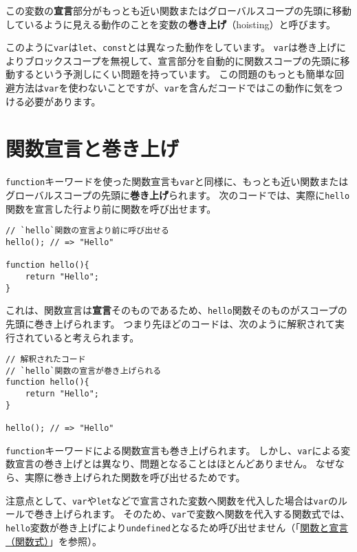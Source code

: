 この変数の\textbf{宣言}部分がもっとも近い関数またはグローバルスコープの先頭に移動しているように見える動作のことを変数の\textbf{巻き上げ}（hoisting）と呼びます。

このように\texttt{var}は\texttt{let}、\texttt{const}とは異なった動作をしています。
\texttt{var}は巻き上げによりブロックスコープを無視して、宣言部分を自動的に関数スコープの先頭に移動するという予測しにくい問題を持っています。
この問題のもっとも簡単な回避方法は\texttt{var}を使わないことですが、\texttt{var}を含んだコードではこの動作に気をつける必要があります。

\hypertarget{function-declaration-hoisting}{%
\section{関数宣言と巻き上げ}\label{function-declaration-hoisting}}

\texttt{function}キーワードを使った関数宣言も\texttt{var}と同様に、もっとも近い関数またはグローバルスコープの先頭に\textbf{巻き上げ}られます。
次のコードでは、実際に\texttt{hello}関数を宣言した行より前に関数を呼び出せます。

\begin{lstlisting}
// `hello`関数の宣言より前に呼び出せる
hello(); // => "Hello"

function hello(){
    return "Hello";
}
\end{lstlisting}

これは、関数宣言は\textbf{宣言}そのものであるため、\texttt{hello}関数そのものがスコープの先頭に巻き上げられます。
つまり先ほどのコードは、次のように解釈されて実行されていると考えられます。

\begin{lstlisting}
// 解釈されたコード
// `hello`関数の宣言が巻き上げられる
function hello(){
    return "Hello";
}

hello(); // => "Hello"
\end{lstlisting}

\texttt{function}キーワードによる関数宣言も巻き上げられます。
しかし、\texttt{var}による変数宣言の巻き上げとは異なり、問題となることはほとんどありません。
なぜなら、実際に巻き上げられた関数を呼び出せるためです。

注意点として、\texttt{var}や\texttt{let}などで宣言された変数へ関数を代入した場合は\texttt{var}のルールで巻き上げられます。
そのため、\texttt{var}で変数へ関数を代入する関数式では、\texttt{hello}変数が巻き上げにより\texttt{undefined}となるため呼び出せません（「\href{../function-declaration/README.md\#function-expression}{関数と宣言（関数式）}」を参照）。

